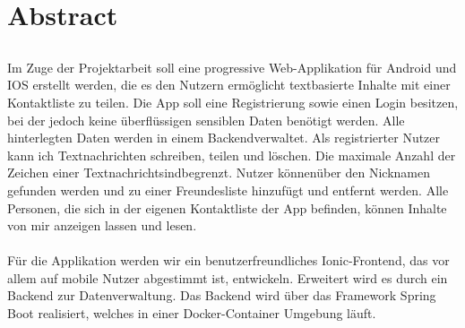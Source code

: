 \chapter*{Abstract}
\section*{\trtitleDE}
Im Zuge der Projektarbeit soll eine progressive Web-Applikation für Android und IOS erstellt werden, die es den Nutzern ermöglicht textbasierte Inhalte mit einer Kontaktliste zu teilen. Die App soll eine Registrierung sowie einen Login besitzen, bei der jedoch keine überflüssigen sensiblen Daten benötigt werden. Alle hinterlegten Daten werden in einem Backendverwaltet. Als registrierter Nutzer kann ich Textnachrichten schreiben, teilen und löschen. Die maximale Anzahl der Zeichen einer Textnachrichtsindbegrenzt. Nutzer könnenüber den Nicknamen gefunden werden und zu einer Freundesliste hinzufügt und entfernt werden. Alle Personen, die sich in der eigenen Kontaktliste der App befinden, können Inhalte von mir anzeigen lassen und lesen.
\\\\
Für die Applikation werden wir ein benutzerfreundliches Ionic-Frontend, das vor allem auf mobile Nutzer abgestimmt ist, entwickeln. Erweitert wird es durch ein Backend zur Datenverwaltung. Das Backend wird über das Framework Spring Boot realisiert, welches in einer Docker-Container Umgebung läuft.


